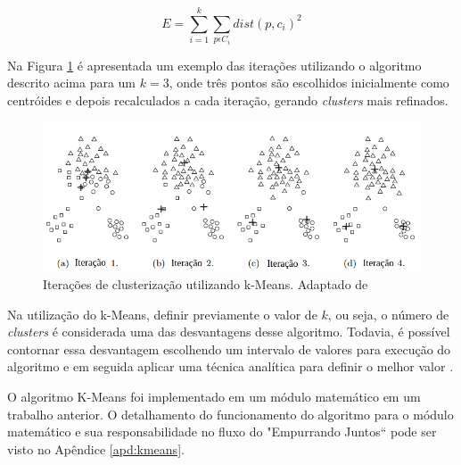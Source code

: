 \begin{equation} \label{eq:variacao}
  E = \sum_{i=1}^{k} \sum_{p \epsilon C_{i}} dist(p, c_i)^2
\end{equation}

Na Figura \ref{fig:iteracoes_kmeans} é apresentada um exemplo das iterações utilizando o algoritmo descrito acima para um $k = 3$,
onde três pontos são escolhidos inicialmente como centróides e depois recalculados a cada iteração, gerando \textit{clusters} mais
refinados.

\begin{figure}[h!]
\centering
\includegraphics[scale=0.6]{figuras/iteracoes_kmeans.png}
\caption{Iterações de clusterização utilizando k-Means. Adaptado de }
\label{fig:iteracoes_kmeans}
\end{figure}

Na utilização do k-Means, definir previamente o valor de $k$, ou seja, o número de \textit{clusters} é considerada uma das desvantagens desse algoritmo. Todavia,
é possível contornar essa desvantagem escolhendo um intervalo de valores para execução do algoritmo e em seguida aplicar
uma técnica analítica para definir o melhor valor \cite{han2011data}.

O algoritmo K-Means foi implementado em um módulo matemático em um trabalho anterior. O detalhamento do funcionamento do algoritmo
para o módulo matemático e sua responsabilidade no fluxo do "Empurrando Juntos`` pode ser visto no Apêndice \ref{apd:kmeans}.

